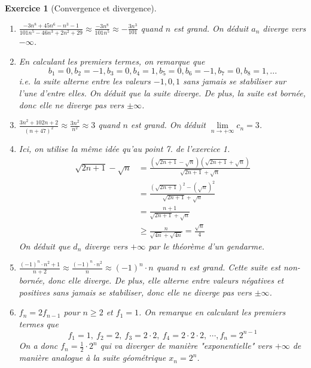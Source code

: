 \documentclass[11.5pt,french,table]{article}
\newcommand{\enumeratelinefix}{\leavevmode \vspace{-\baselineskip}} %
\theoremstyle{exercice}
\newtheorem{exercice}{Exercice}
\begin{document}
\begin{exercice}[Convergence et divergence]
\enumeratelinefix
\begin{enumerate}
    \item $\displaystyle \frac{-3n^8 + 45n^6 - n^3 - 1}{101n^5 - 46n^3 + 2n^2 + 29} \approx \frac{-3n^8}{101n^5} \approx -\frac{3n^3}{101}$ quand $n$ est grand. On déduit $a_n$ diverge vers $-\infty$.
    
    \item En calculant les premiers termes, on remarque que 
    $$b_1 = 0, b_2 = -1, b_3 = 0, b_4 = 1, b_5 = 0, b_6 = -1, b_7 = 0, b_8 = 1, ...$$ 
    i.e. la suite alterne entre les valeurs $-1,0,1$ sans jamais se stabiliser sur l'une d'entre elles. On déduit que la suite diverge. De plus, la suite est bornée, donc elle ne diverge pas vers $\pm \infty$.
    
    \item $\displaystyle \frac{3n^2 + 102n + 2}{(n+47)^2} \approx \frac{3n^2}{n^2} \approx 3$ quand $n$ est grand. On déduit  $\displaystyle \lim \limits_{n \to +\infty} c_n = 3$.
    
    \item Ici, on utilise la même idée qu'au point 7. de l'exercice 1.
     \begin{align*}
     \sqrt{2n + 1} - \sqrt{n} &= \frac{(\sqrt{2n + 1} - \sqrt{n})(\sqrt{2n + 1} + \sqrt{n})}{\sqrt{2n + 1} + \sqrt{n}} \\ 
     &= \frac{(\sqrt{2n+1})^2 - (\sqrt{n})^2}{\sqrt{2n + 1} + \sqrt{n}} \\
     &= \frac{n+1}{\sqrt{2n + 1} + \sqrt{n}} \\
     &\geq \frac{n}{\sqrt{4n} + \sqrt{4n}} = \frac{\sqrt{n}}{4}
     \end{align*}
     On déduit que $d_n$ diverge vers $+\infty$ par le théorème d'un gendarme.
     
    \item $\displaystyle \frac{(-1)^n \cdot n^2 + 1}{n + 2} \approx \frac{(-1)^n \cdot n^2}{n} \approx (-1)^n \cdot n$ quand $n$ est grand. Cette suite est non-bornée, donc elle diverge. De plus, elle alterne entre valeurs négatives et positives sans jamais se stabiliser, donc elle ne diverge pas vers $\pm \infty$.
    
    \item $\displaystyle f_n =  2f_{n-1}$ pour $n \geq 2$ et $f_1 = 1$. On remarque en calculant les premiers termes que 
$$f_1 = 1, \ f_2 = 2, \ f_3 = 2 \cdot 2, \ f_4 = 2 \cdot 2 \cdot 2, \ \cdots, f_n = 2^{n-1}$$
On a donc $f_n = \frac{1}{2} \cdot 2^n$ qui va diverger de manière "exponentielle" vers $+\infty$ de manière analogue à la suite géométrique $x_n = 2^n$.
\end{enumerate}
\end{exercice}
\end{document}
